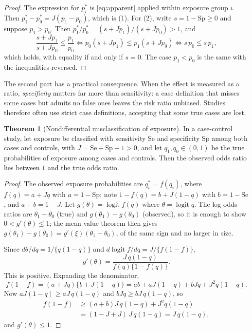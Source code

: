 \documentclass[11pt,a4paper]{article}
\numberwithin{equation}{section}
\theoremstyle{definition}
\newtheorem{thm}{Theorem}[subsection]
\begin{document}
\begin{proof}
The expression for $p_i^*$ is \eqref{eq:apparent} applied within exposure group $i$. Then $p_1^* - p_0^* = J(p_1 - p_0)$, which is (1). For (2), write
$s = 1 - \text{Sp} \geq 0$ and suppose $p_1 > p_0$. Then $p_1^*/p_0^* = (s + Jp_1)/(s + Jp_0) > 1$, and
\[
\frac{s + Jp_1}{s + Jp_0} \leq \frac{p_1}{p_0} \iff p_0 (s + Jp_1) \leq p_1 (s + Jp_0) \iff s\,p_0 \leq s\,p_1 ,
\]
which holds, with equality if and only if $s = 0$. The case $p_1 < p_0$ is the same with the inequalities reversed.
\end{proof}

The second part has a practical consequence. When the effect is measured as a ratio, \emph{specificity} matters far more than sensitivity:
a case definition that misses some cases but admits no false ones leaves the risk ratio unbiased. Studies therefore often use strict case
definitions, accepting that some true cases are lost.

\begin{thm}[Nondifferential misclassification of exposure]
\label{thm:nde}
In a case-control study, let exposure be classified with sensitivity Se and specificity Sp among both cases and controls, with
$J = \text{Se} + \text{Sp} - 1 > 0$, and let $q_1, q_0 \in (0, 1)$ be the true probabilities of exposure among cases and controls. Then the observed odds ratio lies
between $1$ and the true odds ratio.
\end{thm}

\begin{proof}
The observed exposure probabilities are $q_i^* = f(q_i)$, where $f(q) = a + Jq$ with $a = 1 - \text{Sp}$; note $1 - f(q) = b + J(1 - q)$ with $b = 1 - \text{Se}$, and
$a + b = 1 - J$. Let $g(\theta) = \operatorname{logit} f(q)$ where $\theta = \operatorname{logit} q$. The log odds ratios are $\theta_1 - \theta_0$ (true) and $g(\theta_1) - g(\theta_0)$ (observed), so it is
enough to show $0 < g'(\theta) \leq 1$; the mean value theorem then gives $g(\theta_1) - g(\theta_0) = g'(\xi)(\theta_1 - \theta_0)$, of the same sign and no larger in size.

Since $d\theta/dq = 1/\{q(1 - q)\}$ and $d \operatorname{logit} f/dq = J/\{f(1 - f)\}$,
\[
g'(\theta) = \frac{J\,q(1 - q)}{f(q)\{1 - f(q)\}} .
\]
This is positive. Expanding the denominator,
\[
f(1 - f) = (a + Jq)\{b + J(1 - q)\} = ab + aJ(1 - q) + bJq + J^2 q(1 - q) .
\]
Now $aJ(1 - q) \geq aJ\,q(1 - q)$ and $bJq \geq bJ\,q(1 - q)$, so
\begin{align*}
f(1 - f) &\geq (a + b)J\,q(1 - q) + J^2 q(1 - q) \\
&= (1 - J + J)\,J\,q(1 - q) = J\,q(1 - q) ,
\end{align*}
and $g'(\theta) \leq 1$.
\end{proof}
\end{document}
